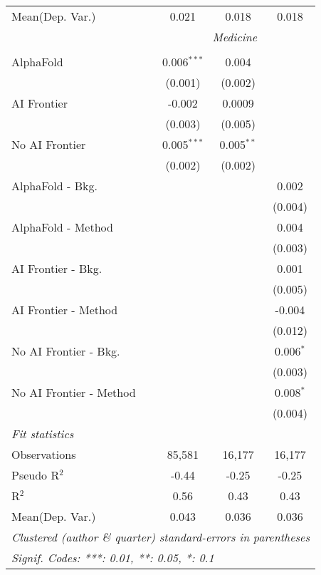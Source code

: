 \begin{tabular}{lccc}
Mean(Dep. Var.) & 0.021 & 0.018 & 0.018 \\
 & \multicolumn{3}{c}{\textit{Medicine}} \\ \\
   AlphaFold               & 0.006$^{***}$ & 0.004        &   \\   
                           & (0.001)       & (0.002)      &   \\   
   AI Frontier             & -0.002        & 0.0009       &   \\   
                           & (0.003)       & (0.005)      &   \\   
   No AI Frontier          & 0.005$^{***}$ & 0.005$^{**}$ &   \\   
                           & (0.002)       & (0.002)      &   \\   
   AlphaFold - Bkg.        &               &              & 0.002\\   
                           &               &              & (0.004)\\   
   AlphaFold - Method      &               &              & 0.004\\   
                           &               &              & (0.003)\\   
   AI Frontier - Bkg.      &               &              & 0.001\\   
                           &               &              & (0.005)\\   
   AI Frontier - Method    &               &              & -0.004\\   
                           &               &              & (0.012)\\   
   No AI Frontier - Bkg.   &               &              & 0.006$^{*}$\\   
                           &               &              & (0.003)\\   
   No AI Frontier - Method &               &              & 0.008$^{*}$\\   
                           &               &              & (0.004)\\   
   \midrule
   \emph{Fit statistics}\\
   Observations            & 85,581        & 16,177       & 16,177\\  
   Pseudo R$^2$            & -0.44         & -0.25        & -0.25\\  
   R$^2$                   & 0.56          & 0.43         & 0.43\\  
Mean(Dep. Var.) & 0.043 & 0.036 & 0.036 \\
   \midrule \midrule
   \multicolumn{4}{l}{\emph{Clustered (author \& quarter) standard-errors in parentheses}}\\
   \multicolumn{4}{l}{\emph{Signif. Codes: ***: 0.01, **: 0.05, *: 0.1}}\\
\end{tabular}
\par\endgroup
